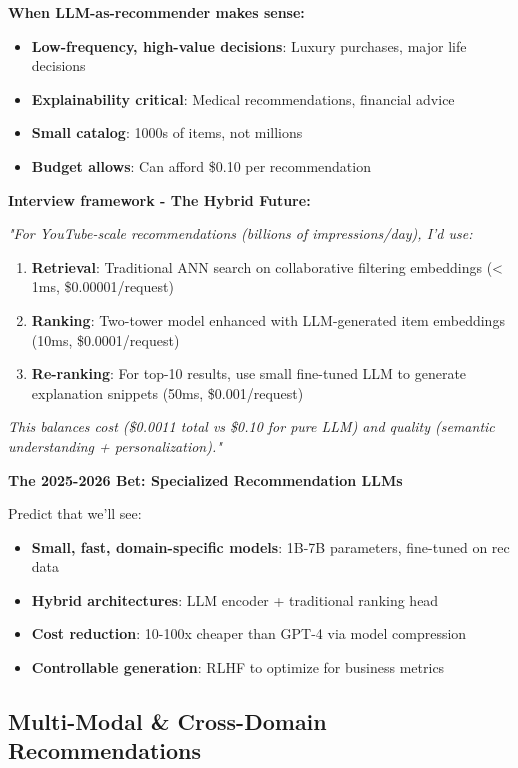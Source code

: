 \documentclass[10pt]{article}
\begin{document}
\textbf{When LLM-as-recommender makes sense:}
\begin{itemize}
\item \textbf{Low-frequency, high-value decisions}: Luxury purchases, major life decisions
\item \textbf{Explainability critical}: Medical recommendations, financial advice
\item \textbf{Small catalog}: 1000s of items, not millions
\item \textbf{Budget allows}: Can afford \$0.10 per recommendation
\end{itemize}

\textbf{Interview framework - The Hybrid Future:}

\textit{"For YouTube-scale recommendations (billions of impressions/day), I'd use:}
\begin{enumerate}
\item \textbf{Retrieval}: Traditional ANN search on collaborative filtering embeddings (< 1ms, \$0.00001/request)
\item \textbf{Ranking}: Two-tower model enhanced with LLM-generated item embeddings (10ms, \$0.0001/request)
\item \textbf{Re-ranking}: For top-10 results, use small fine-tuned LLM to generate explanation snippets (50ms, \$0.001/request)
\end{enumerate}

\textit{This balances cost (\$0.0011 total vs \$0.10 for pure LLM) and quality (semantic understanding + personalization)."}

\textbf{The 2025-2026 Bet: Specialized Recommendation LLMs}

Predict that we'll see:
\begin{itemize}
\item \textbf{Small, fast, domain-specific models}: 1B-7B parameters, fine-tuned on rec data
\item \textbf{Hybrid architectures}: LLM encoder + traditional ranking head
\item \textbf{Cost reduction}: 10-100x cheaper than GPT-4 via model compression
\item \textbf{Controllable generation}: RLHF to optimize for business metrics
\end{itemize}

\subsection{Multi-Modal \& Cross-Domain Recommendations}
\end{document}
